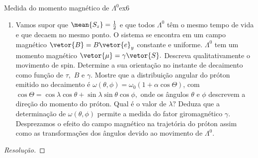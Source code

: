 \begin{exercício}{Medida do momento magnético de \(\Lambda^0\)}{ex6}
\begin{enumerate}[label=(\alph*)]
         \(\pi^- + p \to \Lambda^0 + K^0.\) Devido à conservação de momento \(\vetor{p}_\pi, \vetor{p}_\Lambda,\) e \(\vetor{p}_K\) são coplanares. Tomamos \(\vetor{e}_z\) como o eixo perpendicular a esse plano,
         \begin{equation*}
            \vetor{e}_z = \frac{\vetor{p}_\pi \times \vetor{p}_\Lambda}{\norm{\vetor{p}_\pi \times \vetor{p}_\Lambda}},
         \end{equation*}
         e tomamos \(\vetor{p}_\Lambda = p_\Lambda \vetor{e}_y.\) Sabendo que paridade é conservada na reação de produção e que os prótons não são polarizados, mostre que se \(\vetor{S}\) é o operador de spin de \(\Lambda^0,\) então \(\mean{S_x} = \mean{S_y} = 0.\)
      \item Vamos supor que \(\mean{S_z} = \frac12\) e que todos \(\Lambda^0\) têm o mesmo tempo de vida e que decaem no mesmo ponto. O sistema se encontra em um campo magnético \(\vetor{B} = B \vetor{e}_y\) constante e uniforme. \(\Lambda^0\) tem um momento magnético \(\vetor{\mu} = \gamma \vetor{S}.\) Descreva qualitativamente o movimento de spin. Determine a sua orientação no instante de decaimento como função de \(\tau,\) \(B\) e \(\gamma\). Mostre que a distribuição angular do próton emitido no decaimento é \(\omega(\theta, \phi) = \omega_0 (1 + \alpha \cos\Theta)\), com \(\cos\Theta = \cos \lambda \cos\theta + \sin \lambda \sin \theta \cos \phi,\) onde os ângulos \(\theta\) e \(\phi\) descrevem a direção do momento do próton. Qual é o valor de \(\lambda?\) Deduza que a determinação de \(\omega(\theta,\phi)\) permite a medida do fator giromagnético \(\gamma\). Desprezamos o efeito do campo magnético na trajetória do próton assim como as transformações dos ângulos devido ao movimento de \(\Lambda^0.\)
   \end{enumerate}
\end{exercício}
\begin{proof}[Resolução]
    
\end{proof}
